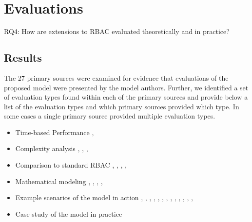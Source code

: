 \section{Evaluations} \label{sec:evaluations}

RQ4: How are extensions to RBAC evaluated theoretically and in practice?

\subsection{Results}

The 27 primary sources were examined for evidence that evaluations of the proposed model were presented by the model authors.
Further, we identified a set of evaluation types found within  each of the primary sources and provide below a list of the 
evaluation types and which primary sources provided which type.  In some cases a single primary source provided multiple evaluation
types.

\begin{itemize}
\setlength{\itemsep}{0.25pt}
\item Time-based Performance \cite{ni2010privacy}, \cite{aich09:role}
\item Complexity analysis \cite{bao08:role}, \cite{zhang06:collaborative}, \cite{chen08:spatio-temporal}, \cite{aich09:role}
\item Comparison to standard RBAC \cite{bao08:role}, \cite{zou2009crbac}, \cite{zhang06:collaborative}, \cite{zhao2008flexible}, \cite{ray07:spatio}
\item Mathematical modeling \cite{damiani2007geo}, \cite{hansen2003spatial}, \cite{aich07:STARBAC}, \cite{chen08:spatio-temporal}, \cite{joshi05:generalized}
\item Example scenarios of the model in action \cite{alam06:constraint}, \cite{tzelepi01:flexible}, \cite{cholewka00:acontext-sensitive}, \cite{huang06:pervasive}, \cite{bao08:role}, \cite{jian2008extended}, \cite{yamazaki04:designing}, \cite{zou2009crbac}, \cite{ray07:spatio}, \cite{samuel07:spatio-temporal}, \cite{joshi05:generalized}, \cite{yao2008task}, \cite{zhou2007team}, \cite{oh2003task}
\item Case study of the model in practice \cite{motta03:contextual}
\end{itemize}

